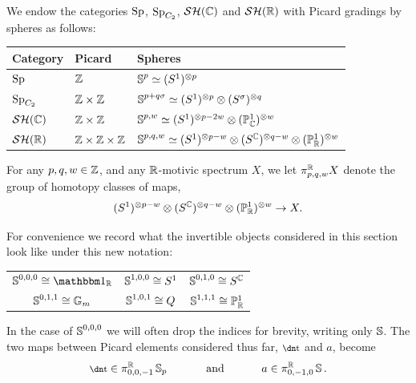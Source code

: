 \begin{ntn}
  We endow the categories $\operatorname{\mathrm{Sp}}$, $\operatorname{\mathrm{Sp}}_{C_2}$, $\mathcal{SH}(\mathbb{C})$ and $\mathcal{SH}(\mathbb{R})$ with Picard gradings by spheres as follows:
  \begin{center}
    \renewcommand{\arraystretch}{1.1}
    \begin{tabular}{|l|l|l|} \hline
      Category & Picard & Spheres \\\hline\hline
      $\operatorname{\mathrm{Sp}}$ & $\mathbb{Z}$ & $\operatorname{\mathbb{S}}^p \simeq (S^1)^{\otimes p}$ \\\hline
      $\operatorname{\mathrm{Sp}}_{C_2}$ & $\mathbb{Z} \times \mathbb{Z}$ & $\operatorname{\mathbb{S}}^{p+q\sigma} \simeq (S^1)^{\otimes p} \otimes (S^\sigma)^{\otimes q}$ \\\hline
      $\mathcal{SH}(\mathbb{C})$ & $\mathbb{Z} \times \mathbb{Z}$ & $\operatorname{\mathbb{S}}^{p,w} \simeq (S^1)^{\otimes p-2w} \otimes (\mathbb{P}_{\mathbb{C}}^1)^{\otimes w}$ \\\hline
      $\mathcal{SH}(\mathbb{R})$ & $\mathbb{Z} \times \mathbb{Z} \times \mathbb{Z}$ & $\operatorname{\mathbb{S}}^{p,q,w} \simeq (S^1)^{\otimes p-w} \otimes (S^{\mathbb{C}})^{\otimes q-w} \otimes (\mathbb{P}_{\mathbb{R}}^1)^{\otimes w}$ \\\hline
    \end{tabular}
    \renewcommand{\arraystretch}{1.0}
  \end{center}
  
  For any $p,q,w \in \mathbb{Z}$, and any $\mathbb{R}$-motivic spectrum $X$, we let $\pi^{\mathbb{R}}_{p,q,w} X$ denote the group of homotopy classes of maps,
  \[ (S^1)^{\otimes p-w} \otimes (S^{\mathbb{C}})^{\otimes q-w} \otimes (\mathbb{P}_{\mathbb{R}}^1)^{\otimes w} \to X. \]
\end{ntn}

\begin{exm}
  For convenience we record what the invertible objects considered in this section look like under this new notation:
  \begin{center}
    \begin{tabular}{ccc}   
      $\Ss^{0,0,0} \cong \o_\R$ \qquad\qquad\qquad &
      $\operatorname{\mathbb{S}}^{1,0,0} \cong S^1$ \qquad\qquad\qquad & 
      $\operatorname{\mathbb{S}}^{0,1,0} \cong S^{\mathbb{C}}$ \\
      $\operatorname{\mathbb{S}}^{0,1,1} \cong \mathbb{G}_m$ \qquad\qquad\qquad &
      $\operatorname{\mathbb{S}}^{1,0,1} \cong Q$ \qquad\qquad\qquad &
      $\operatorname{\mathbb{S}}^{1,1,1} \cong \mathbb{P}_{\mathbb{R}}^1$
    \end{tabular}
  \end{center}
  In the case of $\operatorname{\mathbb{S}}^{0,0,0}$ we will often drop the indices for brevity, writing only $\operatorname{\mathbb{S}}$.
  The two maps between Picard elements considered thus far, $\ta$ and $a$, become
  \[ \ta \in \pi_{0,0,-1}^\R \Ss_p \qquad\quad \text{ and } \qquad\quad a \in \pi_{0,-1,0}^\R \Ss. \]
\end{exm}

